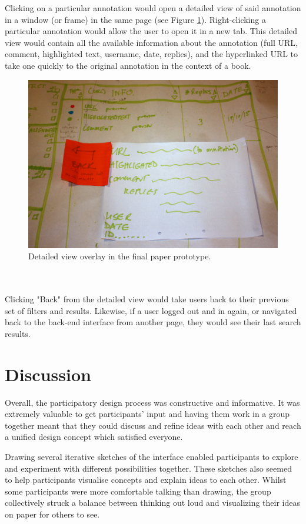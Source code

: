 Clicking on a particular annotation would open a detailed view of said annotation in a window (or frame) in the same page (see Figure \ref{fig:detailedoverlay}). Right-clicking a particular annotation would allow the user to open it in a new tab. This detailed view would contain all the available information about the annotation (full URL, comment, highlighted text, username, date, replies), and the hyperlinked URL to take one quickly to the original annotation in the context of a book.
\begin{figure}[h!]
    \centering
    \includegraphics[width=\textwidth]{Figures/IMG_9044.JPG}
 \caption{Detailed view overlay in the final paper prototype.}
 \label{fig:detailedoverlay}
\end{figure}
\\
\\
Clicking "Back" from the detailed view would take users back to their previous set of filters and results. Likewise, if a user logged out and in again, or navigated back to the back-end interface from another page, they would see their last search results. 

\section{Discussion}
Overall, the participatory design process was constructive and informative. It was extremely valuable to get participants' input and having them work in a group together meant that they could discuss and refine ideas with each other and reach a unified design concept which satisfied everyone. 

Drawing several iterative sketches of the interface enabled participants to explore and experiment with different possibilities together. These sketches also seemed to help participants visualise concepts and explain ideas to each other. Whilst some participants were more comfortable talking than drawing, the group collectively struck a balance between thinking out loud and visualizing their ideas on paper for others to see.

